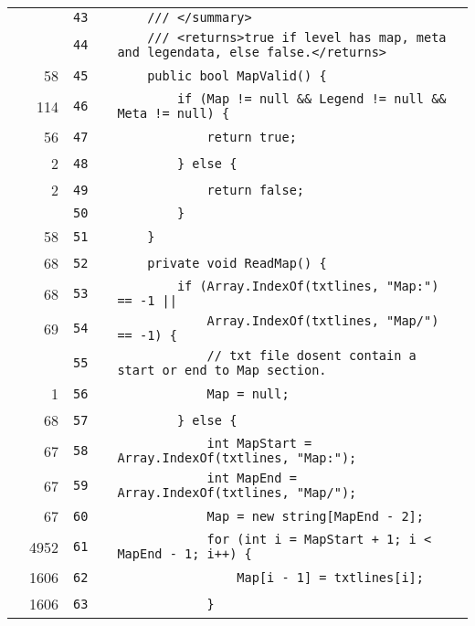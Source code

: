 \documentclass[a4paper,landscape,10pt]{article}
\begin{document}
\begin{longtable}[l]{lrrll}
\cellcolor{gray} &  & \verb~43~ & & \verb~    /// </summary>~\\
\cellcolor{gray} &  & \verb~44~ & & \verb~    /// <returns>true if level has map, meta and legendata, else false.</returns>~\\
\cellcolor{green} & 58 & \verb~45~ & & \verb~    public bool MapValid() {~\\
\cellcolor{green} & 114 & \verb~46~ & & \verb~        if (Map != null && Legend != null && Meta != null) {~\\
\cellcolor{green} & 56 & \verb~47~ & & \verb~            return true;~\\
\cellcolor{green} & 2 & \verb~48~ & & \verb~        } else {~\\
\cellcolor{green} & 2 & \verb~49~ & & \verb~            return false;~\\
\cellcolor{gray} &  & \verb~50~ & & \verb~        }~\\
\cellcolor{green} & 58 & \verb~51~ & & \verb~    }~\\
\cellcolor{green} & 68 & \verb~52~ & & \verb~    private void ReadMap() {~\\
\cellcolor{orange} & 68 & \verb~53~ & & \verb~        if (Array.IndexOf(txtlines, "Map:") == -1 ||~\\
\cellcolor{green} & 69 & \verb~54~ & & \verb~            Array.IndexOf(txtlines, "Map/") == -1) {~\\
\cellcolor{gray} &  & \verb~55~ & & \verb~            // txt file dosent contain a start or end to Map section.~\\
\cellcolor{green} & 1 & \verb~56~ & & \verb~            Map = null;~\\
\cellcolor{green} & 68 & \verb~57~ & & \verb~        } else {~\\
\cellcolor{green} & 67 & \verb~58~ & & \verb~            int MapStart = Array.IndexOf(txtlines, "Map:");~\\
\cellcolor{green} & 67 & \verb~59~ & & \verb~            int MapEnd = Array.IndexOf(txtlines, "Map/");~\\
\cellcolor{green} & 67 & \verb~60~ & & \verb~            Map = new string[MapEnd - 2];~\\
\cellcolor{green} & 4952 & \verb~61~ & & \verb~            for (int i = MapStart + 1; i < MapEnd - 1; i++) {~\\
\cellcolor{green} & 1606 & \verb~62~ & & \verb~                Map[i - 1] = txtlines[i];~\\
\cellcolor{green} & 1606 & \verb~63~ & & \verb~            }~\\

\end{longtable}
\end{document}
